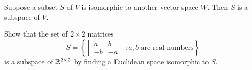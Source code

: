 \begin{applicationActivities}{4}{10}
\begin{fact}
  Suppose a subset \(S\) of \(V\) is isomorphic to another vector space
  \(W\).
  Then \(S\) is a subspace of \(V\).
\end{fact}

\begin{activity}{5}
  Show that the set of \(2\times 2\) matrices
  \[S=
    \left\{
    \begin{bmatrix}a&b\\-b&-a\end{bmatrix} :
    a,b\text{ are real numbers}
    \right\}
  \]
  is a subspace of \(\mathbb{R}^{2\times 2}\) by finding a Euclidean
  space isomorphic to \(S\).
\end{activity}



\end{applicationActivities}
